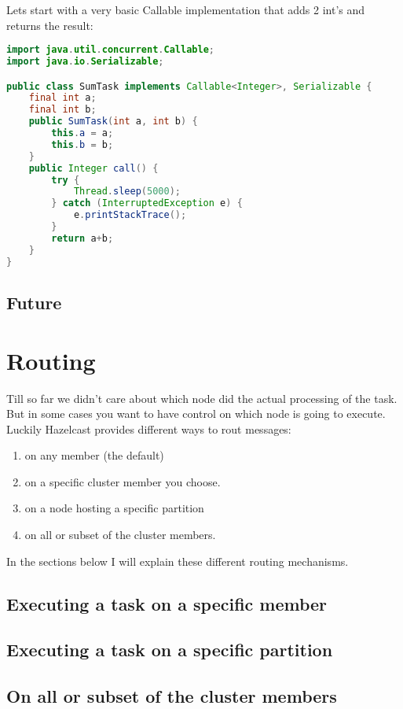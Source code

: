 Lets start with a very basic Callable implementation that adds 2 int's and returns the result:
\begin{lstlisting}[language=java]
import java.util.concurrent.Callable;
import java.io.Serializable;

public class SumTask implements Callable<Integer>, Serializable {
    final int a;
    final int b;
    public SumTask(int a, int b) {
        this.a = a;
        this.b = b;
    }
    public Integer call() {
        try {
            Thread.sleep(5000); 
        } catch (InterruptedException e) {
            e.printStackTrace();
        }	    
        return a+b;
    }
}

\end{lstlisting}

\subsection{Future}

\section{Routing}

Till so far we didn't care about which node did the actual processing of the task. But in some cases you want to have control on which node is going to execute. Luckily Hazelcast provides different ways to rout messages:
\begin{enumerate}
\item on any member (the default)
\item on a specific cluster member you choose.
\item on a node hosting a specific partition
\item on all or subset of the cluster members.
\end{enumerate}
In the sections below I will explain these different routing mechanisms.

\subsection{Executing a task on a specific member}

\subsection{Executing a task on a specific partition}

\subsection{On all or subset of the cluster members}

